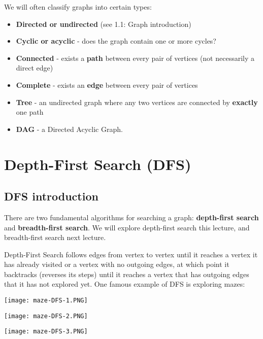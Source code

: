 \documentclass{article}
\begin{document}
\begin{note}
    We will often classify graphs into certain types:
    \begin{itemize}
        \setlength\itemsep{0.05em} 
        \item \textbf{Directed or undirected} (see 1.1: Graph introduction)
        \item \textbf{Cyclic or acyclic} - does the graph contain one or more cycles?
        \item \textbf{Connected} - exists a \textbf{path} between every pair of vertices (not necessarily a direct edge)
        \item \textbf{Complete} - exists an \textbf{edge} between every pair of vertices
        \item \textbf{Tree} - an undirected graph where any two vertices are connected by \textbf{exactly} one path
        \item \textbf{DAG} - a Directed Acyclic Graph.
    \end{itemize}
\end{note}

\newpage
\section{Depth-First Search (DFS)}

\subsection{DFS introduction}

There are two fundamental algorithms for searching a graph: \textbf{depth-first search} and \textbf{breadth-first search}. We will explore depth-first search this lecture, and breadth-first search next lecture.

Depth-First Search follows edges from vertex to vertex until it reaches a vertex it has already visited or a vertex with no outgoing edges, at which point it backtracks (reverses its steps) until it reaches a vertex that has outgoing edges that it has not explored yet. One famous example of DFS is exploring mazes:

\noindent
\begin{minipage}{.33\linewidth}
    \texttt{[image: maze-DFS-1.PNG]}
    
    \label{tab:my_label}
\end{minipage}
\begin{minipage}{.33\linewidth}
    \texttt{[image: maze-DFS-2.PNG]}
    
    \label{tab:my_label}
\end{minipage}
\begin{minipage}{.33\linewidth}
    \texttt{[image: maze-DFS-3.PNG]}
    
    \label{tab:my_label}
\end{minipage}
\end{document}
